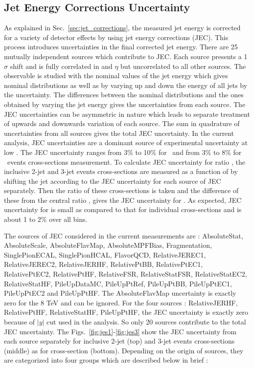 \subsection{Jet Energy Corrections Uncertainty}
\label{sec:jecs_unc}
As explained in Sec.~\ref{sec:jet_corrections}, the measured jet energy is corrected for a variety of detector effects by using jet energy corrections (JEC). This process introduces uncertainties in the final corrected jet energy. There are 25 mutually independent sources which contribute to JEC. Each source presents a 1$\sigma$ shift and is fully correlated in \pt and $\eta$ but uncorrelated to all other sources. The observable is studied with the nominal values of the jet energy which gives nominal distributions as well as by varying up and down the energy of all jets by the uncertainty. The differences between the nominal distributions and the ones obtained by varying the jet energy gives the uncertainties from each source. The JEC uncertainties can be asymmetric in nature which leads to separate treatment of upwards and downwards variation of each source. The sum in quadrature of uncertainties from all sources gives the total JEC uncertainty. In the current analysis, JEC uncertainties are a dominant source of experimental uncertainty at low \httwo. The JEC uncertainty ranges from 3\% to 10\% for \njt~and from 3\% to 8\% for \njth~events cross-sections measurement. To calculate JEC uncertainty for ratio \rations, the inclusive 2-jet and 3-jet events cross-sections are measured as a function of \httwo by shifting the jet \pt according to the JEC uncertainty for each source of JEC separately. Then the ratio of these cross-sections is taken and the difference of these from the central ratio \rations, gives the JEC uncertainty for \ratio. As expected, JEC uncertainty for \ratio is small as compared to that for individual cross-sections and is about 1 to 2\% over all \httwo bins.

 The sources of JEC considered in the current measurements are : AbsoluteStat, AbsoluteScale, AbsoluteFlavMap, AbsoluteMPFBias, Fragmentation, SinglePionECAL, SinglePionHCAL, FlavorQCD, RelativeJEREC1, RelativeJEREC2, RelativeJERHF, RelativePtBB, RelativePtEC1, RelativePtEC2, RelativePtHF, RelativeFSR, RelativeStatFSR, RelativeStatEC2, RelativeStatHF, PileUpDataMC, PileUpPtRef, PileUpPtBB, PileUpPtEC1, PileUpPtEC2 and PileUpPtHF. The AbsoluteFlavMap uncertainty is exactly zero for the 8 TeV and can be ignored. For the four sources : RelativeJERHF, RelativePtHF, RelativeStatHF, PileUpPtHF, the JEC uncertainty is exactly zero because of $|y|$  cut used in the analysis. So only 20 sources contribute to the total JEC uncertainty. The Figs.~\ref{fig:jes1}-\ref{fig:jes3} show the JEC uncertainty from each source separately for inclusive 2-jet (top) and 3-jet events cross-sections (middle) as for cross-section \ratio (bottom). Depending on the origin of sources, they are categorized into four groups which are described below in brief :

